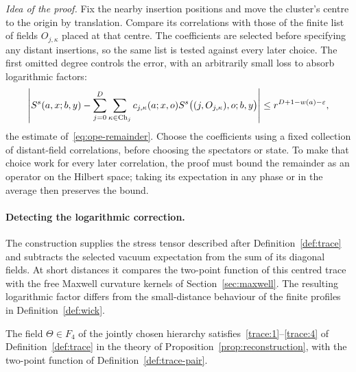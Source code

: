 \emph{Idea of the proof.}
Fix the nearby insertion positions and move the cluster's centre to the origin by translation. Compare its correlations with those of the finite list of fields $O_{j,\kappa}$ placed at that centre. The coefficients are selected before specifying any distant insertions, so the same list is tested against every later choice.
The first omitted degree controls the error, with an arbitrarily small loss to absorb logarithmic factors:
\begin{equation*}
\left|S^s(a,x;b,y)-\sum_{j=0}^D\sum_{\kappa\in\operatorname{Ch}_{j}}
 c_{j,\kappa}(a;x,o)S^s\bigl((j,O_{j,\kappa}),o;b,y\bigr)\right|
\le r^{D+1-w(a)-\varepsilon},
\end{equation*}
the estimate of~\eqref{eq:ope-remainder}.
Choose the coefficients using a fixed collection of distant-field correlations, before choosing the spectators or state. To make that choice work for every later correlation, the proof must bound the remainder as an operator on the Hilbert space; taking its expectation in any phase or in the average then preserves the bound.


\paragraph{Detecting the logarithmic correction.}
The construction supplies the stress tensor described after Definition~\ref{def:trace} and subtracts the selected vacuum expectation from the sum of its diagonal fields.
At short distances it compares the two-point function of this centred trace with the free Maxwell curvature kernels of Section~\ref{sec:maxwell}.
The resulting logarithmic factor differs from the small-distance behaviour of the finite profiles in Definition~\ref{def:wick}.

\begin{proposition}\label{prop:trace}
The field $\Theta\in F_4$ of the jointly chosen hierarchy satisfies~\ref{trace:1}--\ref{trace:4} of Definition~\ref{def:trace} in the theory of Proposition~\ref{prop:reconstruction}, with the two-point function of Definition~\ref{def:trace-pair}.
\end{proposition}

